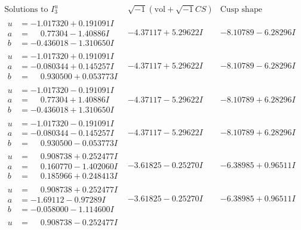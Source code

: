 \documentclass[1p]{elsarticle_modified}
\theoremstyle{definition}
\newcommand{\I}{\sqrt{-1}}
\begin{document}
$$\begin{array}{c|c|c}  
\text{Solutions to }I^u_{3}& \I (\text{vol} + \sqrt{-1}CS) & \text{Cusp shape}\\
 \hline 
\begin{aligned}
u &= -1.017320 + 0.191091 I \\
a &= \phantom{-}0.77304 - 1.40886 I \\
b &= -0.436018 - 1.310650 I\end{aligned}
 & -4.37117 + 5.29622 I & -8.10789 - 6.28296 I \\ \hline\begin{aligned}
u &= -1.017320 + 0.191091 I \\
a &= -0.080344 + 0.145257 I \\
b &= \phantom{-}0.930500 + 0.053773 I\end{aligned}
 & -4.37117 + 5.29622 I & -8.10789 - 6.28296 I \\ \hline\begin{aligned}
u &= -1.017320 - 0.191091 I \\
a &= \phantom{-}0.77304 + 1.40886 I \\
b &= -0.436018 + 1.310650 I\end{aligned}
 & -4.37117 - 5.29622 I & -8.10789 + 6.28296 I \\ \hline\begin{aligned}
u &= -1.017320 - 0.191091 I \\
a &= -0.080344 - 0.145257 I \\
b &= \phantom{-}0.930500 - 0.053773 I\end{aligned}
 & -4.37117 - 5.29622 I & -8.10789 + 6.28296 I \\ \hline\begin{aligned}
u &= \phantom{-}0.908738 + 0.252477 I \\
a &= \phantom{-}0.160770 - 1.402060 I \\
b &= \phantom{-}0.185966 + 0.248413 I\end{aligned}
 & -3.61825 - 0.25270 I & -6.38985 + 0.96511 I \\ \hline\begin{aligned}
u &= \phantom{-}0.908738 + 0.252477 I \\
a &= -1.69112 - 0.97289 I \\
b &= -0.058000 - 1.114600 I\end{aligned}
 & -3.61825 - 0.25270 I & -6.38985 + 0.96511 I \\ \hline\begin{aligned}
u &= \phantom{-}0.908738 - 0.252477 I \\

\end{aligned}
\end{array}$$
\end{document}
